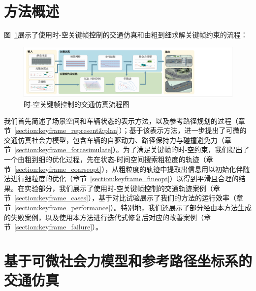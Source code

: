 \section{方法概述}

图~\ref{fig:keyframe_overview}展示了使用时-空关键帧控制的交通仿真和由粗到细求解关键帧约束的流程：
\begin{figure}[!h]
\centering
\includegraphics[width=\textwidth]{figure/keyframe/framework_v3.1_cn.pdf}
\caption[时-空关键帧控制的交通仿真流程图]{
时-空关键帧控制的交通仿真流程图
}
\label{fig:keyframe_overview}
\end{figure}

我们首先简述了场景空间和车辆状态的表示方法，以及参考路径规划的过程（章节~\ref{section:keyframe_represent&plan}）；基于该表示方法，进一步提出了可微的交通仿真社会力模型，包含车辆的自驱动力、路径保持力与碰撞避免力（章节~\ref{section:keyframe_forcesimulate}）。为了满足关键帧的时-空约束，我们提出了一个由粗到细的优化过程，先在状态-时间空间搜索粗粒度的轨迹（章节~\ref{section:keyframe_coarseopt}），从粗粒度的轨迹中提取出信息用以初始化伴随法进行细粒度的优化（章节~\ref{section:keyframe_fineopt}）以得到平滑且合理的结果。在实验部分，我们展示了使用时-空关键帧控制的交通轨迹案例（章节~\ref{section:keyframe_cases}），基于对比试验展示了我们的方法的运行效率（章节~\ref{section:keyframe_performance}）。特别地，我们还展示了部分经由本方法生成的失败案例，以及使用本方法进行迭代式修复后对应的改善案例（章节~\ref{section:keyframe_failure}）。





\section{基于可微社会力模型和参考路径坐标系的交通仿真}


